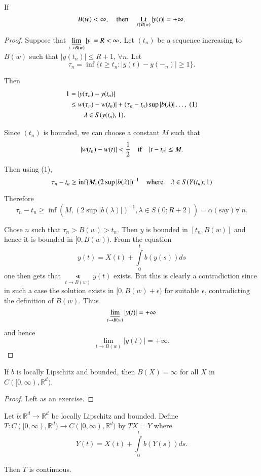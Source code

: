 \begin{prop*}
If
$$
B(w)<\infty,\quad \text{then}\quad \operatorname*{Lt}\limits_{t\uparrow
  B(w)}|y(t)|=+\infty.
$$
\end{prop*}

\begin{proof}
Suppose that $\varliminf\limits_{t\to B(w)}|y|=R<\infty$. Let
$(t_{n})$ be a sequence increasing to $B(w)$ such that $|y(t_{n})|\leq
R+1$, $\forall n$. Let
$$
\tau_{n}=\inf\{t\geq t_{n}:|y(t)-y(-_{n})|\geq 1\}.
$$

Then
\begin{align*}
1 &= |y(\tau_{n})-y(t_{n})|\\
&\leq w(\tau_{n})-w(t_{n})|+(\tau_{n}-t_{n})\sup
|b(\lambda)|\ldots,\ (1)\\
&\qquad \lambda\in S(y(t_{n}),1).
\end{align*}

Since $(t_{n})$ is bounded, we can choose a constant $M$ such that
$$
|w(t_{n})-w(t)|<\frac{1}{2}\quad\text{if}\quad|t-t_{n}|\leq M.
$$

Then using (1),
$$
\tau_{n}-t_{n}\geq \inf\{M,(2\sup|b(\lambda)|)^{-1}\quad\text{where}\quad
\lambda\in S(Y(t_{n});1)
$$

Therefore
$$
\tau_{n}-t_{n}\geq \inf (M,(2\sup |b(\lambda)|)^{-1},\lambda\in
S(0;R+2))=\alpha(\text{say})\forall\ n.
$$\pageoriginale

Chose $n$ such that $\tau_{n}>B(w)>t_{n}$. Then $y$ is bounded in
$[t_{n},B(w)]$ and hence it is bounded in $[0,B(w))$. From the
  equation
$$
y(t)=X(t)+\int\limits^{t}_{0}b(y(s))ds
$$
one then gets that $\Lt\limits_{t\to B(w)}y(t)$ exists. But this is
clearly a contradiction since in such a case the solution exists in
$[0,B(w)+\epsilon)$ for suitable $\epsilon$, contradicting the
  definition of $B(w)$. Thus
$$
\varliminf\limits_{t\to B(w)}|y(t)|=+\infty
$$
and hence
$$
\lim\limits_{t\to B(w)}|y(t)|=+\infty.
$$
\end{proof}

\begin{coro*}
If $b$ is locally Lipschitz and bounded, then $B(X)=\infty$ for all
$X$ in $C([0,\infty),\mathbb{R}^{d})$.
\end{coro*}

\begin{proof}
Left as an exercise.
\end{proof}

\begin{prop*}
Let $b:\mathbb{R}^{d}\to \mathbb{R}^{d}$ be locally Lipschitz and
bounded. Define 
$T:C([0,\infty),\mathbb{R}^{d})\to C([0,\infty),\mathbb{R}^{d})$ by $TX=Y$ where
$$
Y(t)=X(t)+\int\limits^{t}_{0}b(Y(s))ds.
$$

Then $T$ is continuous.
\end{prop*}

